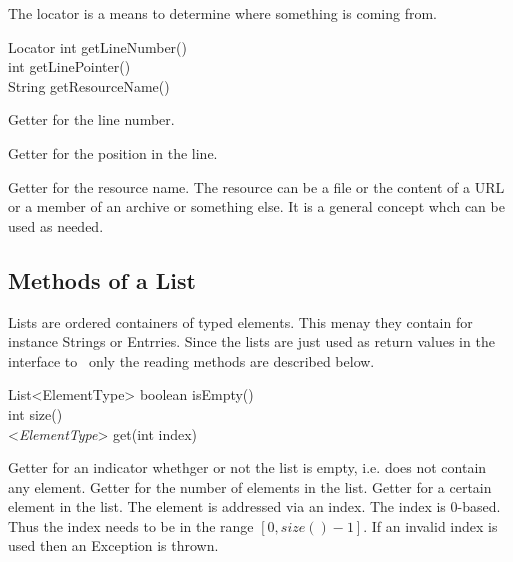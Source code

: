 The locator is a means to determine where something is coming from.

\begin{UMLclass}{Locator}
  int getLineNumber()\\
  int getLinePointer()\\
  String getResourceName()
\end{UMLclass}

\begin{methods}

    Getter for the line number.

    Getter for the position in the line.

    Getter for the resource name. The resource can be a file or the content of
    a URL or a member of an archive or something else. It is a general concept
    whch can be used as needed.

\end{methods}

\subsection{Methods of a List}\label{sec:groovy.list}

Lists are ordered containers of typed elements. This menay they
contain for instance Strings or Entrries. Since the lists are just
used as return values in the interface to \ExBib\ only the reading
methods are described below.

\begin{UMLclass}{List<ElementType>}
  boolean isEmpty()\\
  int size()\\
  <\textit{ElementType}> get(int index)
\end{UMLclass}

\begin{methods}
    Getter for an indicator whethger or not the list is empty, i.e.
    does not contain any element.
    Getter for the number of elements in the list.
    Getter for a certain element in the list. The element is addressed
    via an index. The index is 0-based. Thus the index needs to be in
    the range $[0,size()-1]$. If an invalid index is used then an
    Exception is thrown.
\end{methods}

